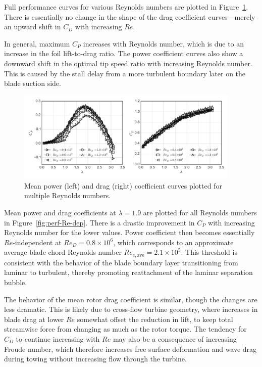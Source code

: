 \documentclass[energies,article,accept,moreauthors,pdftex,12pt,a4paper]{mdpi}
\begin{document}
Full performance curves for various Reynolds numbers are plotted in
Figure~\ref{fig:perf-curves}. There is essentially no change in the shape of the
drag coefficient curves---merely an upward shift in $C_D$ with increasing $Re$.

In general, maximum $C_P$ increases with Reynolds number, which is due to an
increase in the foil lift-to-drag ratio. The power coefficient curves also show
a downward shift in the optimal tip speed ratio with increasing Reynolds number.
This is caused by the stall delay from a more turbulent boundary later on the
blade suction side.

\begin{figure}[ht]
\includegraphics[width=0.95\textwidth]{figures/perf_curves}
\caption{Mean power (left) and drag (right) coefficient curves plotted for
multiple Reynolds numbers.}
\label{fig:perf-curves}
\end{figure}

Mean power and drag coefficients at $\lambda=1.9$ are plotted for all Reynolds
numbers in Figure~\ref{fig:perf-Re-dep}. There is a drastic improvement in $C_P$
with increasing Reynolds number for the lower values. Power coefficient then
becomes  essentially $Re$-independent at $Re_D = 0.8 \times 10^6$, which
corresponds to an approximate average blade chord Reynolds number $Re_{c,
\mathrm{ave}} = 2.1 \times 10^5$. This threshold is consistent with the behavior
of the blade boundary layer transitioning from laminar to turbulent, thereby
promoting reattachment of the laminar separation bubble.

The behavior of the mean rotor drag coefficient is similar, though the changes
are less dramatic. This is likely due to cross-flow turbine geometry, where
increases in blade drag at lower $Re$ somewhat offset the reduction in lift, to
keep total streamwise force from changing as much as the rotor torque. The
tendency for $C_D$ to continue increasing with $Re$ may also be a consequence of
increasing Froude number, which therefore increases free surface deformation and
wave drag during towing without increasing flow through the turbine.
\end{document}
